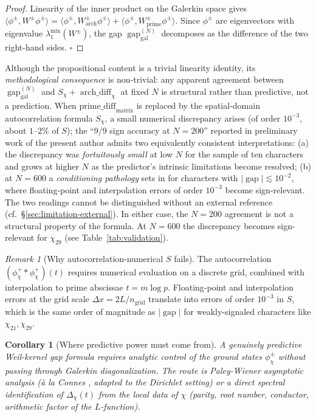 \documentclass[a4paper,10pt,twocolumn]{article}
\newtheorem{corollary}[theorem]{Corollary}
\theoremstyle{definition}
\theoremstyle{remark}
\newtheorem{remark}[theorem]{Remark}
\newcommand{\gap}{\operatorname{gap}}
\newcommand{\chifn}{\chi}
\newcommand{\Deltachi}{\Delta_{\chifn}}
\newcommand{\archdiff}{\operatorname{arch\_diff}}
\begin{document}
\begin{proof}
Linearity of the inner product on the Galerkin space gives
$\langle\phi^\pm, W^\pm\phi^\pm\rangle = \langle\phi^\pm,
W^\pm_{\mathrm{arch}}\phi^\pm\rangle + \langle\phi^\pm,
W^\pm_{\mathrm{prime}}\phi^\pm\rangle$.
Since $\phi^\pm$ are eigenvectors with eigenvalue
$\lambda_1^{\min}(W^\pm)$, the gap
$\gap_{\mathrm{gal}}^{(N)}$ decomposes as the difference of the two
right-hand sides. $\square$
\end{proof}

Although the propositional content is a trivial linearity identity, its
\emph{methodological consequence} is non-trivial: any apparent agreement
between $\gap_{\mathrm{gal}}^{(N)}$ and $S_\chi + \archdiff_\chi$ at fixed
$N$ is structural rather than predictive, not a prediction. When
$\mathrm{prime\_diff}_{\mathrm{matrix}}$ is replaced by the spatial-domain
autocorrelation formula $S_{\chifn}$, a small numerical discrepancy arises
(of order $10^{-3}$, about $1$--$2\%$ of $S$); the ``9/9 sign accuracy at
$N=200$'' reported in preliminary work of the present author admits two
equivalently consistent interpretations: (a) the discrepancy was
\emph{fortuitously small} at low $N$ for the sample of ten characters and
grows at higher $N$ as the predictor's intrinsic limitations become
resolved; (b) at $N=600$ a \emph{conditioning pathology} sets in for
characters with $|\gap|\lesssim 10^{-2}$, where floating-point and
interpolation errors of order $10^{-3}$ become sign-relevant. The two
readings cannot be distinguished without an external reference (cf.\
\S\ref{sec:limitation-external}). In either case, the $N=200$ agreement
is not a structural property of the formula. At $N=600$ the discrepancy
becomes sign-relevant for $\chifn_{29}$ (see Table~\ref{tab:validation}).

\begin{remark}[Why autocorrelation-numerical $S$ fails]
The autocorrelation $(\phi_{\chifn}^+\ast\phi_{\chifn}^+)(t)$ requires
numerical evaluation on a discrete grid, combined with interpolation to
prime abscissae $t=m\log p$. Floating-point and interpolation errors
at the grid scale $\Delta x = 2L/n_{\mathrm{grid}}$ translate into errors
of order $10^{-3}$ in $S$, which is the same order of magnitude as
$|\gap|$ for weakly-signaled characters like $\chi_{21},\chi_{29}$.
\end{remark}

\begin{corollary}[Where predictive power must come from]
\label{cor:paleywiener}
A genuinely predictive Weil-kernel gap formula requires analytic control
of the ground states $\phi^\pm_{\chifn}$ \emph{without} passing through
Galerkin diagonalization. The route is Paley-Wiener asymptotic analysis
(\`a la Connes \cite{Connes}, adapted to the Dirichlet setting) or a
direct spectral identification of $\Deltachi(t)$ from the local data
of $\chifn$ (parity, root number, conductor, arithmetic factor of the
$L$-function).
\end{corollary}
\end{document}
